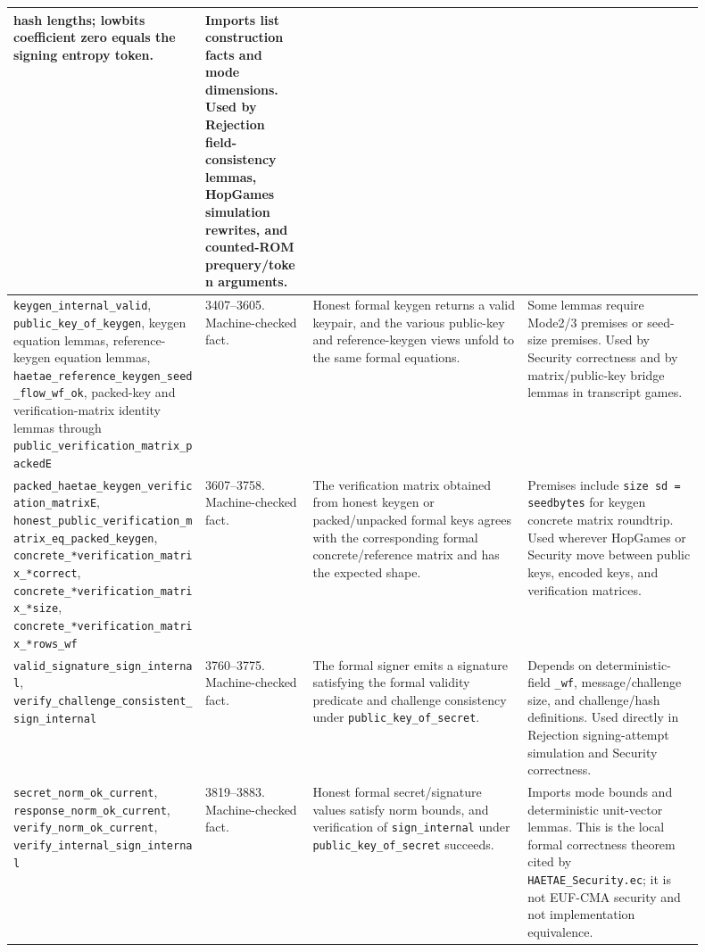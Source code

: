 \documentclass[11pt]{report}
\DeclareRobustCommand{\file}[1]{\ifmmode\text{\nolinkurl{#1}}\else\nolinkurl{#1}\fi}
\DeclareRobustCommand{\ec}[1]{\ifmmode\text{\nolinkurl{#1}}\else\nolinkurl{#1}\fi}
\theoremstyle{definition}
\theoremstyle{plain}
\begin{document}
{\begin{longtable}{p{0.25\linewidth}p{0.14\linewidth}p{0.28\linewidth}p{0.23\linewidth}}
hash lengths; lowbits coefficient zero equals the signing entropy token. &
Imports list construction facts and mode dimensions.  Used by Rejection
field-consistency lemmas, HopGames simulation rewrites, and counted-ROM
prequery/token arguments. \\
\midrule
\ec{keygen\_internal\_valid}, \ec{public\_key\_of\_keygen},
keygen equation lemmas, reference-keygen equation lemmas,
\ec{haetae\_reference\_keygen\_seed\_flow\_wf\_ok},
packed-key and verification-matrix identity lemmas through
\ec{public\_verification\_matrix\_packedE} &
3407--3605. Machine-checked fact. &
Honest formal keygen returns a valid keypair, and the various public-key and
reference-keygen views unfold to the same formal equations. &
Some lemmas require Mode2/3 premises or seed-size premises.  Used by Security
correctness and by matrix/public-key bridge lemmas in transcript games. \\
\midrule
\ec{packed\_haetae\_keygen\_verification\_matrixE},
\ec{honest\_public\_verification\_matrix\_eq\_packed\_keygen},
\ec{concrete\_*verification\_matrix\_*correct},
\ec{concrete\_*verification\_matrix\_*size},
\ec{concrete\_*verification\_matrix\_*rows\_wf} &
3607--3758. Machine-checked fact. &
The verification matrix obtained from honest keygen or packed/unpacked formal
keys agrees with the corresponding formal concrete/reference matrix and has
the expected shape. &
Premises include \ec{size sd = seedbytes} for keygen concrete matrix
roundtrip.  Used wherever HopGames or Security move between public keys,
encoded keys, and verification matrices. \\
\midrule
\ec{valid\_signature\_sign\_internal},
\ec{verify\_challenge\_consistent\_sign\_internal} &
3760--3775. Machine-checked fact. &
The formal signer emits a signature satisfying the formal validity predicate
and challenge consistency under \ec{public\_key\_of\_secret}. &
Depends on deterministic-field \ec{\_wf}, message/challenge size, and
challenge/hash definitions.  Used directly in Rejection signing-attempt
simulation and Security correctness. \\
\midrule
\ec{secret\_norm\_ok\_current},
\ec{response\_norm\_ok\_current},
\ec{verify\_norm\_ok\_current},
\ec{verify\_internal\_sign\_internal} &
3819--3883. Machine-checked fact. &
Honest formal secret/signature values satisfy norm bounds, and verification of
\ec{sign\_internal} under \ec{public\_key\_of\_secret} succeeds. &
Imports mode bounds and deterministic unit-vector lemmas.  This is the local
formal correctness theorem cited by \file{HAETAE\_Security.ec}; it is not
EUF-CMA security and not implementation equivalence. \\
\bottomrule
\end{longtable}
}
\end{document}
